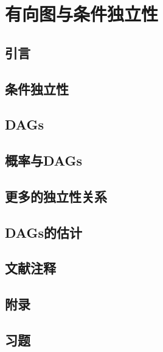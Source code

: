 \chapter{有向图与条件独立性}

\section{引言}

\pending

\section{条件独立性}

\pending

\section{DAGs}

\pending

\section{概率与DAGs}

\pending

\section{更多的独立性关系}

\pending

\section{DAGs的估计}

\pending

\section{文献注释}

\pending

\section{附录}

\pending

\section{习题}

\pending
